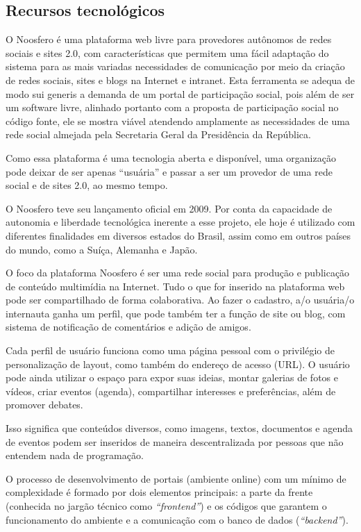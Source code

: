\documentclass{article}
\begin{document}
\subsection{Recursos tecnológicos}

O Noosfero é uma plataforma web livre para provedores autônomos de redes
sociais e sites 2.0, com características que permitem uma fácil adaptação do
sistema para as mais variadas necessidades de comunicação por meio da criação
de redes sociais, sites e blogs na Internet e intranet. Esta ferramenta se
adequa de modo sui generis a demanda de um portal de participação social, pois
além de ser um software livre, alinhado portanto com  a proposta de
participação social no código fonte, ele se mostra viável atendendo amplamente
as necessidades de uma rede social almejada pela Secretaria Geral da
Presidência da República.

Como essa plataforma é uma tecnologia aberta e disponível, uma organização pode
deixar de ser apenas ``usuária'' e passar a ser um provedor de uma rede social e
de sites 2.0, ao mesmo tempo.

O Noosfero teve seu lançamento oficial em 2009. Por conta da capacidade de
autonomia e liberdade tecnológica inerente a esse projeto, ele hoje é utilizado
com diferentes finalidades em diversos estados do Brasil, assim como em outros
países do mundo, como a Suíça, Alemanha e Japão.

O foco da plataforma Noosfero é ser uma rede social para produção e publicação
de conteúdo multimídia na Internet. Tudo o que for inserido na plataforma web
pode ser compartilhado de forma colaborativa. Ao fazer o cadastro, a/o
usuária/o internauta ganha um perfil, que pode também ter a função de site ou
blog, com sistema de notificação de comentários e adição de amigos.

Cada perfil de usuário funciona como uma página pessoal com o privilégio de
personalização de layout, como também do endereço de acesso (URL). O usuário
pode ainda utilizar o espaço para expor suas ideias, montar galerias de fotos e
vídeos, criar eventos (agenda), compartilhar interesses e preferências, além de
promover debates.

Isso significa que conteúdos diversos, como imagens, textos, documentos e
agenda de eventos podem ser inseridos de maneira descentralizada por pessoas
que não entendem nada de programação.

O processo de desenvolvimento de portais (ambiente online) com um mínimo de
complexidade é formado por dois elementos principais: a parte da frente
(conhecida no jargão técnico como {\it ``frontend''}) e os códigos que garantem o
funcionamento do ambiente e a comunicação com o banco de dados ({\it ``backend''}).
\end{document}

